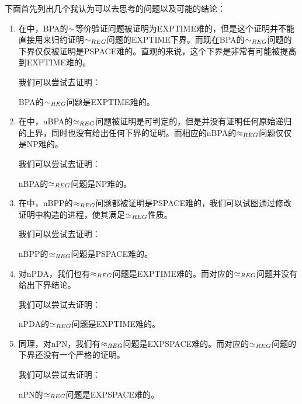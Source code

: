 下面首先列出几个我认为可以去思考的问题以及可能的结论：

\begin{enumerate}
\item 在\cite{Kiefer2012}中，BPA的$\sim$等价验证问题被证明为EXPTIME难的，但是这个证明并不能直接用来归约证明$\sim_{REG}$问题的EXPTIME下界。而现在BPA的$\sim_{REG}$问题的下界仅仅被证明是PSPACE难的\cite{Srba2002b}。直观的来说，这个下界是非常有可能被提高到EXPTIME难的。

我们可以尝试去证明：

\begin{conj}\label{conj:bpa-seq-reg}
BPA的$\sim_{REG}$问题是EXPTIME难的。
\end{conj}

\item 在\cite{Fu2013}中，nBPA的$\simeq_{REG}$问题被证明是可判定的，但是并没有证明任何原始递归的上界，同时也没有给出任何下界的证明。而相应的nBPA的$\approx_{REG}$问题仅仅是NP难的\cite{Srba2003,StriAbra1998}。

我们可以尝试去证明：

\begin{conj}\label{conj:nbpa-beq-reg}
nBPA的$\simeq_{REG}$问题是NP难的。
\end{conj}

\item 在\cite{Srba2003}中，nBPP的$\approx_{REG}$问题都被证明是PSPACE难的，我们可以试图通过修改证明中构造的进程，使其满足$\simeq_{REG}$性质。

我们可以尝试去证明：

\begin{conj}\label{conj:nbpp-beq-reg}
nBPP的$\simeq_{REG}$问题是PSPACE难的。
\end{conj}

\item 对nPDA，我们也有$\approx_{REG}$问题是EXPTIME难的\cite{Kucera2002a,Srba2002b}。而对应的$\simeq_{REG}$问题并没有给出下界结论。

我们可以尝试去证明：

\begin{conj}\label{conj:npda-beq-reg}
nPDA的$\simeq_{REG}$问题是EXPTIME难的。
\end{conj}

\item 同理，对nPN，我们有$\approx_{REG}$问题是EXPSPACE难的\cite{Cardoza1976}。而对应的$\simeq_{REG}$问题的下界还没有一个严格的证明。

我们可以尝试去证明：

\begin{conj}\label{conj:npn-beq-reg}
nPN的$\simeq_{REG}$问题是EXPSPACE难的。
\end{conj}
\end{enumerate}

